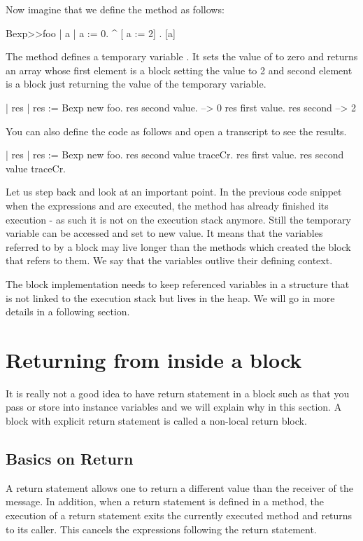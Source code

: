 \documentclass[a4paper,10pt,twoside]{book}
\begin{document}
Now imagine that we define the method  as follows:

\begin{code}{}
Bexp>>foo
	| a |
	a := 0. 
	^ {[ a := 2] . [a]} 
\end{code}

The method  defines a temporary variable . It sets the value of 
to zero and returns an array whose first element is a block setting the value to 2 and second element is a block just returning the value of the temporary variable. 

\begin{code}{}
| res | 
res := Bexp new foo.
res second value.
     --> 0
res first value.
res second
     --> 2
\end{code}

You can also define the code as follows and open a transcript to see the results.

\begin{code}
| res |
res := Bexp new foo.
res second value traceCr.
res first value.
res second value traceCr.
\end{code}

Let us step back and look at an important point. 
In the previous code snippet when the expressions  and  are executed, the method  has already finished its execution - as such it is not on the execution stack anymore.  Still the temporary variable  can be accessed and set to new value. It means that the variables referred to by a block may live longer than the methods which created the block that refers to them. We say that the variables outlive their defining context. 

The block implementation needs to keep referenced variables in a structure that is not linked to the execution stack but lives in the heap. We will go in more details in a following section. 



\section{Returning from inside a block}
It is really not a good idea to have return statement in a block such as \ct{[^ 33]} that you pass or store into instance variables and we will explain why in this section. A block with explicit return statement is called a  non-local return block. 

\subsection{Basics on Return}
A return statement allows one to return a different value than the receiver of the message. In addition, when a return statement is defined in a method, the execution of a return statement exits the currently executed method and returns to its caller. This cancels the expressions following the return statement.
\end{document}
